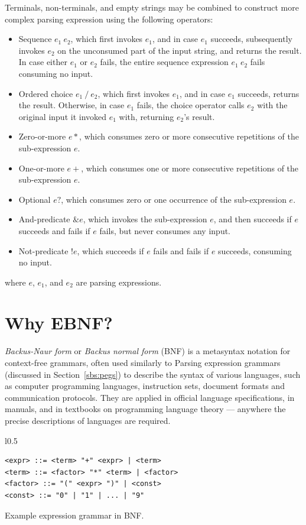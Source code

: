 \documentclass[english,bachelors,forcepolishlogotype]{wizthesis}
\begin{document}
Terminals, non-terminals, and empty strings may be combined to construct more
complex parsing expression using the following operators:
\begin{itemize}[noitemsep]
  \item Sequence $e_1\ e_2$, which first invokes $e_1$, and in case $e_1$
  succeeds, subsequently invokes $e_2$ on the unconsumed part of the input
  string, and returns the result. In case either $e_1$ or $e_2$ fails, the
  entire sequence expression $e_1\ e_2$ fails consuming no input.
  \item Ordered choice $e_1\ /\ e_2$, which first invokes $e_1$, and in case
  $e_1$ succeeds, returns the result. Otherwise, in case $e_1$ fails, the choice
  operator calls $e_2$ with the original input it invoked $e_1$ with, returning
  $e_2$'s result.
  \item Zero-or-more $e*$, which consumes zero or more consecutive repetitions
  of the sub-expression $e$.
  \item One-or-more $e+$, which consumes one or more consecutive repetitions of
  the sub-expression $e$.
  \item Optional $e?$, which consumes zero or one occurrence of the
  sub-expression $e$.
  \item And-predicate $\&e$, which invokes the sub-expression $e$, and then
  succeeds if $e$ succeeds and fails if $e$ fails, but never consumes any input.
  \item Not-predicate $!e$, which succeeds if $e$ fails and fails if $e$
  succeeds, consuming no input.
\end{itemize}
where $e$, $e_1$, and $e_2$ are parsing expressions. 

\section{Why EBNF?} \label{sec:why-ebnf}

\emph{Backus-Naur form} or \emph{Backus normal form} (BNF) is a metasyntax
notation for context-free grammars, often used similarly to Parsing expression
grammars (discussed in Section~\ref{sbs:pegs}) to describe the syntax of various
languages, such as computer programming languages, instruction sets, document
formats and communication protocols. They are applied in official language
specifications, in manuals, and in textbooks on programming language theory ---
anywhere the precise descriptions of languages are required.

\begin{wraplisting}{l}{0.5\textwidth}
  \begin{verbatim}
<expr> ::= <term> "+" <expr> | <term>
<term> ::= <factor> "*" <term> | <factor>
<factor> ::= "(" <expr> ")" | <const>
<const> ::= "0" | "1" | ... | "9"
  \end{verbatim}
  \caption{Example expression grammar in BNF.}
  \label{lst:bnf}
\end{wraplisting}
\end{document}

